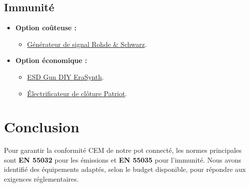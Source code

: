 \documentclass[a4paper,12pt]{article}
\begin{document}
\subsection{Immunité}
\begin{itemize}
    \item \textbf{Option coûteuse :}
          \begin{itemize}
              \item \href{https://www.keysight.com/us/en/assets/7018-05702/technical-overviews/5992-2241.pdf}{Générateur de signal Rohde \& Schwarz}.
          \end{itemize}
    \item \textbf{Option économique :}
          \begin{itemize}
              \item \href{https://www.crowdsupply.com/era-instruments/erasynth-micro}{ESD Gun DIY EraSynth}.
              \item \href{https://www.amazon.com/Patriot-Electric-Fence-Energizer-Joule/dp/B00D9U8MBW/}{Électrificateur de clôture Patriot}.
          \end{itemize}
\end{itemize}

\newpage

\section*{Conclusion}
Pour garantir la conformité CEM de notre pot connecté, les normes principales sont \textbf{EN 55032} pour les émissions et \textbf{EN 55035} pour l'immunité. Nous avons identifié des équipements adaptés, selon le budget disponible, pour répondre aux exigences réglementaires.
\end{document}

